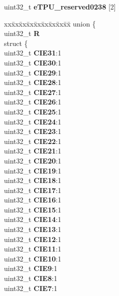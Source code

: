\begin{DoxyCompactItemize}
\begin{tabbing}
\end{tabbing}\item 
\mbox{\label{structETPU__tag_ae8a40d871b807f973d8b0e94a35caa55}} 
uint32\+\_\+t {\bfseries e\+T\+P\+U\+\_\+reserved0238} \mbox{[}2\mbox{]}
\item 
\mbox{\label{structETPU__tag_ad04247745954c0c7573ad6c1ad92a38d}} 
\begin{tabbing}
xx\=xx\=xx\=xx\=xx\=xx\=xx\=xx\=xx\=\kill
union \{\\
\>uint32\_t {\bfseries R}\\
\>struct \{\\
\>\>uint32\_t {\bfseries CIE31}:1\\
\>\>uint32\_t {\bfseries CIE30}:1\\
\>\>uint32\_t {\bfseries CIE29}:1\\
\>\>uint32\_t {\bfseries CIE28}:1\\
\>\>uint32\_t {\bfseries CIE27}:1\\
\>\>uint32\_t {\bfseries CIE26}:1\\
\>\>uint32\_t {\bfseries CIE25}:1\\
\>\>uint32\_t {\bfseries CIE24}:1\\
\>\>uint32\_t {\bfseries CIE23}:1\\
\>\>uint32\_t {\bfseries CIE22}:1\\
\>\>uint32\_t {\bfseries CIE21}:1\\
\>\>uint32\_t {\bfseries CIE20}:1\\
\>\>uint32\_t {\bfseries CIE19}:1\\
\>\>uint32\_t {\bfseries CIE18}:1\\
\>\>uint32\_t {\bfseries CIE17}:1\\
\>\>uint32\_t {\bfseries CIE16}:1\\
\>\>uint32\_t {\bfseries CIE15}:1\\
\>\>uint32\_t {\bfseries CIE14}:1\\
\>\>uint32\_t {\bfseries CIE13}:1\\
\>\>uint32\_t {\bfseries CIE12}:1\\
\>\>uint32\_t {\bfseries CIE11}:1\\
\>\>uint32\_t {\bfseries CIE10}:1\\
\>\>uint32\_t {\bfseries CIE9}:1\\
\>\>uint32\_t {\bfseries CIE8}:1\\
\>\>uint32\_t {\bfseries CIE7}:1\\

\end{tabbing}
\end{DoxyCompactItemize}
